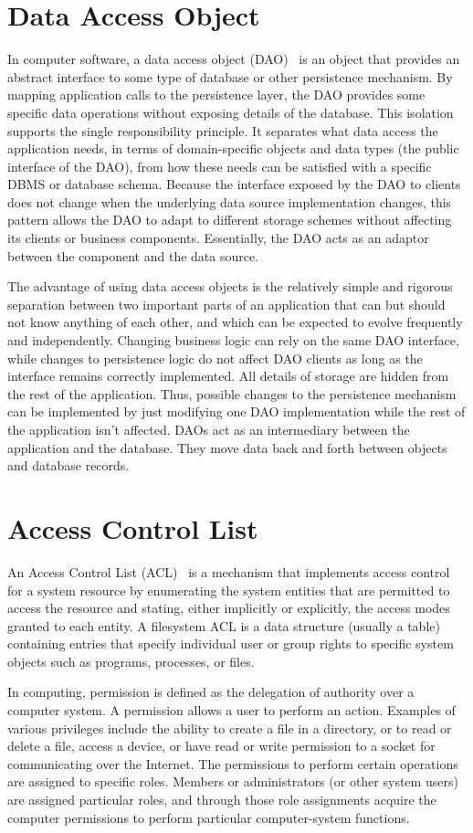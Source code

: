 \section{Data Access Object}
\label{dao}
In computer software, a data access object (DAO)~\cite{DAO} is an object that provides an abstract interface to some type of database or other persistence mechanism. By mapping application calls to the persistence layer, the DAO provides some specific data operations without exposing details of the database. This isolation supports the single responsibility principle. It separates what data access the application needs, in terms of domain-specific objects and data types (the public interface of the DAO), from how these needs can be satisfied with a specific DBMS or database schema. Because the interface exposed by the DAO to clients does not change when the underlying data source implementation changes, this pattern allows the DAO to adapt to different storage schemes without affecting its clients or business components. Essentially, the DAO acts as an adaptor between the component and the data source.\par 
	The advantage of using data access objects is the relatively simple and rigorous separation between two important parts of an application that can but should not know anything of each other, and which can be expected to evolve frequently and independently. Changing business logic can rely on the same DAO interface, while changes to persistence logic do not affect DAO clients as long as the interface remains correctly implemented. All details of storage are hidden from the rest of the application. Thus, possible changes to the persistence mechanism can be implemented by just modifying one DAO implementation while the rest of the application isn't affected. DAOs act as an intermediary between the application and the database. They move data back and forth between objects and database records.

\section{Access Control List}
\label{acl}
An Access Control List (ACL)~\cite{shirey2007internet} is a mechanism that implements access control for a system resource by enumerating the system 	entities that are permitted to access the resource and stating, either implicitly or explicitly, the access modes granted to each entity. A filesystem ACL is a data structure (usually a table) containing entries that specify individual user or group rights to specific system objects such as programs, processes, or files. \par
	In computing, permission is defined as the delegation of authority over a computer system. A permission allows a user to perform an action. Examples of various privileges include the ability to create a file in a directory, or to read or delete a file, access a device, or have read or write permission to a socket for communicating over the Internet. The permissions to perform certain operations are assigned to specific roles. Members or administrators (or other system users) are assigned particular roles, and through those role assignments acquire the computer permissions to perform particular computer-system functions.

